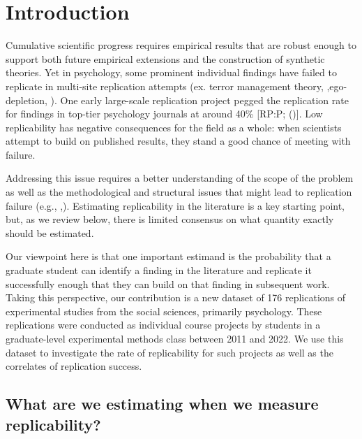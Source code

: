 \documentclass[
  english,
  a4paper,
]{article}
\begin{document}
\endgroup

\newpage

\section{Introduction}\label{introduction}

Cumulative scientific progress requires empirical results that are robust enough to support both future empirical extensions and the construction of synthetic theories. Yet in psychology, some prominent individual findings have failed to replicate in multi-site replication attempts (ex. terror management theory, ,ego-depletion, ). One early large-scale replication project pegged the replication rate for findings in top-tier psychology journals at around 40\% {[}RP:P; (){]}. Low replicability has negative consequences for the field as a whole: when scientists attempt to build on published results, they stand a good chance of meeting with failure.

Addressing this issue requires a better understanding of the scope of the problem as well as the methodological and structural issues that might lead to replication failure (e.g., ,). Estimating replicability in the literature is a key starting point, but, as we review below, there is limited consensus on what quantity exactly should be estimated.

Our viewpoint here is that one important estimand is the probability that a graduate student can identify a finding in the literature and replicate it successfully enough that they can build on that finding in subsequent work. Taking this perspective, our contribution is a new dataset of 176 replications of experimental studies from the social sciences, primarily psychology. These replications were conducted as individual course projects by students in a graduate-level experimental methods class between 2011 and 2022. We use this dataset to investigate the rate of replicability for such projects as well as the correlates of replication success.

\subsection{What are we estimating when we measure replicability?}\label{what-are-we-estimating-when-we-measure-replicability}
\end{document}
